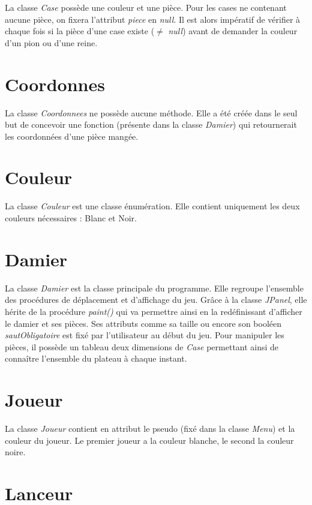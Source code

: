 \documentclass[12,french]{report}
\begin{document}
La classe \textit{Case} possède une couleur et une pièce. Pour les cases ne contenant aucune pièce, on fixera l'attribut \textit{piece} en \textit{null}. Il est alors impératif de vérifier à chaque fois si la pièce d'une case existe ($\neq$ \textit{null}) avant de demander la couleur d'un pion ou d'une reine.


\section{Coordonnes}

La classe \textit{Coordonnees} ne possède aucune méthode. Elle a été créée dans le seul but de concevoir une fonction (présente dans la classe \textit{Damier}) qui retournerait les coordonnées d'une pièce mangée.

\section{Couleur}

La classe \textit{Couleur} est une classe énumération. Elle contient uniquement les deux couleurs nécessaires : Blanc et Noir.

\section{Damier}

La classe \textit{Damier} est la classe principale du programme. Elle regroupe l'ensemble des procédures de déplacement et d'affichage du jeu. Grâce à la classe \textit{JPanel}, elle hérite de la procédure \textit{paint()} qui va permettre ainsi en la redéfinissant d'afficher le damier et ses pièces. Ses attributs comme sa taille ou encore son booléen \textit{sautObligatoire} est fixé par l'utilisateur au début du jeu. Pour manipuler les pièces, il possède un tableau deux dimensions de \textit{Case} permettant ainsi de connaître l'ensemble du plateau à chaque instant.

\section{Joueur}

La classe \textit{Joueur} contient en attribut le pseudo (fixé dans la classe \textit{Menu}) et la couleur du joueur. Le premier joueur a la couleur blanche, le second la couleur noire.

\section{Lanceur}
\end{document}
